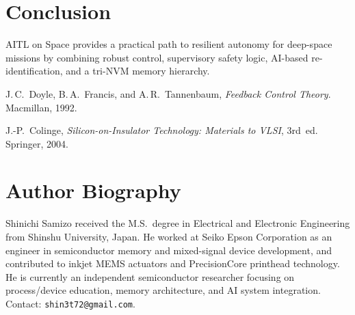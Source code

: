 \documentclass[conference]{IEEEtran}
\begin{document}
\section{Conclusion}
AITL on Space provides a practical path to resilient autonomy for deep-space missions by combining robust control, supervisory safety logic, AI-based re-identification, and a tri-NVM memory hierarchy.

\begin{thebibliography}{99}
J.\,C.~Doyle, B.\,A.~Francis, and A.\,R.~Tannenbaum,
\emph{Feedback Control Theory}. Macmillan, 1992.

J.-P.~Colinge, \emph{Silicon-on-Insulator Technology: Materials to VLSI}, 3rd~ed. Springer, 2004.
\end{thebibliography}

\section*{Author Biography}
Shinichi Samizo received the M.S.\ degree in Electrical and Electronic Engineering from Shinshu University, Japan. He worked at Seiko Epson Corporation as an engineer in semiconductor memory and mixed-signal device development, and contributed to inkjet MEMS actuators and PrecisionCore printhead technology. He is currently an independent semiconductor researcher focusing on process/device education, memory architecture, and AI system integration. Contact: \texttt{shin3t72@gmail.com}.
\end{document}
